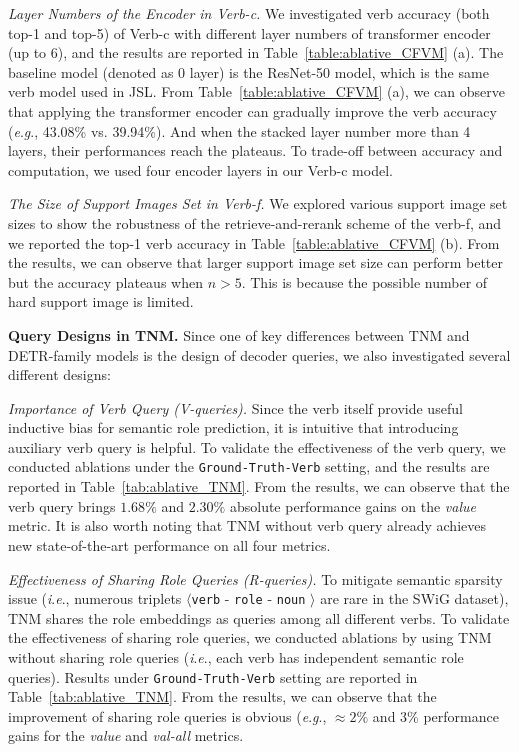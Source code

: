 \documentclass[letterpaper]{article} %
\newcommand{\ie}{\textit{i}.\textit{e}.}
\newcommand{\eg}{\textit{e}.\textit{g}.}
\begin{document}
\noindent\emph{Layer Numbers of the Encoder in Verb-c.} We investigated verb accuracy (both top-1 and top-5) of Verb-c with different layer numbers of transformer encoder (up to 6), and the results are reported in Table~\ref{table:ablative_CFVM} (a). The baseline model (denoted as 0 layer) is the ResNet-50 model, which is the same verb model used in JSL. From Table~\ref{table:ablative_CFVM} (a), we can observe that applying the transformer encoder can gradually improve the verb accuracy (\eg, 43.08\% vs. 39.94\%). And when the stacked layer number more than 4 layers, their performances reach the plateaus. To trade-off between accuracy and computation, we used four encoder layers in our Verb-c model.




\noindent\emph{The Size of Support Images Set in Verb-f.}
We explored various support image set sizes to show the robustness of the retrieve-and-rerank scheme of the verb-f, and we reported the top-1 verb accuracy in Table~\ref{table:ablative_CFVM} (b). From the results, we can observe that larger support image set size can perform better but the accuracy plateaus when $n > 5$.
This is because the possible number of hard support image is limited.

\noindent\textbf{Query Designs in TNM.} Since one of key differences between TNM and DETR-family models is the design of decoder queries, we also investigated several different designs:

\noindent\emph{Importance of Verb Query (V-queries).} Since the verb itself provide useful inductive bias for semantic role prediction, it is intuitive that introducing auxiliary verb query is helpful. To validate the effectiveness of the verb query, we conducted ablations under the \texttt{Ground-Truth-Verb} setting, and the results are reported in Table~\ref{tab:ablative_TNM}. From the results, we can observe that the verb query brings $1.68\%$ and $2.30\%$ absolute performance gains on the \emph{value} metric. It is also worth noting that TNM without verb query already achieves new state-of-the-art performance on all four metrics.


\noindent\emph{Effectiveness of Sharing Role Queries (R-queries).} To mitigate semantic sparsity issue (\ie, numerous triplets $\langle$\texttt{verb} - \texttt{role} - \texttt{noun} $\rangle$ are rare in the SWiG dataset), TNM shares the role embeddings as queries among all different verbs. To validate the effectiveness of sharing role queries, we conducted ablations by using TNM without sharing role queries (\ie, each verb has independent semantic role queries). Results under \texttt{Ground-Truth-Verb} setting are reported in Table~\ref{tab:ablative_TNM}. From the results, we can observe that the improvement of sharing role queries is obvious (\eg, $\approx 2\%$ and  $3\%$ performance gains for the \emph{value} and \emph{val-all} metrics.
\end{document}
